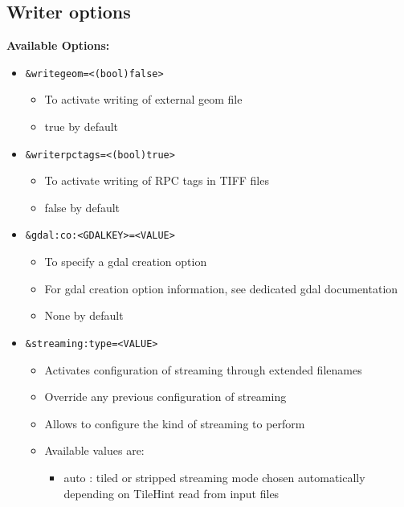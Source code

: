 \subsection{Writer options}

\textbf{Available Options:}

\begin{itemize}

\item \begin{verbatim}&writegeom=<(bool)false>\end{verbatim}
  \begin{itemize}
  \item To activate writing of external geom file
  \item true by default
  \end{itemize}  
\item \begin{verbatim}&writerpctags=<(bool)true>\end{verbatim}
  \begin{itemize}
  \item To activate writing of RPC tags in TIFF files
  \item false by default
  \end{itemize}  
\item \begin{verbatim}&gdal:co:<GDALKEY>=<VALUE>\end{verbatim}
  \begin{itemize}
  \item To specify a gdal creation option
  \item For gdal creation option information, see dedicated gdal documentation
  \item None by default 
  \end{itemize}
\item \begin{verbatim}&streaming:type=<VALUE>\end{verbatim}
  \begin{itemize}
  \item Activates configuration of streaming through extended filenames
  \item Override any previous configuration of streaming
  \item Allows to configure the kind of streaming to perform
  \item Available values are:
    \begin{itemize}
    \item auto : tiled or stripped streaming mode chosen automatically depending on TileHint read from input files

\end{itemize}
\end{itemize}
\end{itemize}
